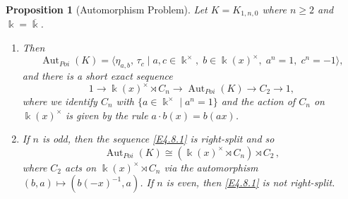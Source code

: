 \documentclass[12pt]{amsart}
\theoremstyle{plain}
\newtheorem{proposition}[theorem]{Proposition}
\numberwithin{theorem}{section}
\numberwithin{equation}{theorem}
\theoremstyle{definition}
\DeclareMathOperator{\Aut}{Aut}
\newcommand \kx {\Bbbk^\times}
\newcommand \kbar {\overline{\Bbbk}}
\begin{document}
\begin{proposition}[Automorphism Problem] 
\label{zzpro4.8} Let $K = K_{1,n,0}$ where $n\geq 2$ and $\Bbbk = \kbar$. 
\begin{enumerate}
\item[(1)] Then
$$\Aut_{Poi}(K)=\langle \eta_{a,b},\, \tau_c \mid a,c \in \kx,\; b\in 
\Bbbk(x)^{\times},\; a^n=1,\; c^n = -1\rangle,$$
and there is a short exact sequence
\begin{equation}  \label{E4.8.1}  \tag{E4.8.1}
1\to \Bbbk(x)^\times \rtimes C_n
\to \Aut_{Poi}(K)\to C_2\to 1,
\end{equation}
where we identify $C_n$ with $\{ a \in \kx \mid a^n = 1 \}$ and the action of $C_n$ on $\Bbbk(x)^{\times}$ is given by the rule
$a \cdot b(x) = b(ax)$.
\item[(2)]
If $n$ is odd, then the sequence \eqref{E4.8.1} is right-split and so $$\Aut_{Poi}(K) 
\cong  (\Bbbk(x)^{\times} \rtimes C_n)\rtimes C_2 \,,$$
where $C_2$ acts on $\Bbbk(x)^{\times} \rtimes C_n$ via the automorphism
$(b,a) \longmapsto (b(-x)^{-1},a)$.
 If $n$ is even, then \eqref{E4.8.1} is not right-split.
\end{enumerate}
\end{proposition}
\end{document}
